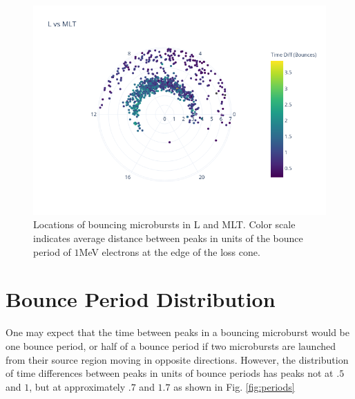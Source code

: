 \documentclass[draft]{agujournal2019}
\begin{document}
\begin{figure}[h!]
\includegraphics[width=\textwidth]{dial.png}
\caption{Locations of bouncing microbursts in L and MLT. Color scale indicates average distance between peaks in units of the bounce period of $1$MeV electrons at the edge of the loss cone.  }
\end{figure}

\section{Bounce Period Distribution}
One may expect that the time between peaks in a bouncing microburst would be one bounce period, or half of a bounce period if two microbursts are launched from their source region moving in opposite directions. 
However, the distribution of time differences between peaks in units of bounce periods has peaks not at $.5$ and $1$, but at approximately $.7$ and $1.7$ as shown in Fig. \ref{fig:periods}
\end{document}
